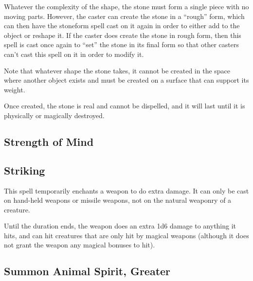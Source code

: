 \begin{multicols*}{2}
Whatever the complexity of the shape, the stone must form a single piece with no moving parts. However, the caster can create the stone in a “rough” form, which can then have the stoneform spell cast on it again in order to either add to the object or reshape it. If the caster does create the stone in rough form, then this spell is cast once again to “set” the stone in its final form so that other casters can’t cast this spell on it in order to modify it.

Note that whatever shape the stone takes, it cannot be created in the space where another object exists and must be created on a surface that can support its weight.

Once created, the stone is real and cannot be dispelled, and it will last until it is physically or magically destroyed.

\subsection{Strength of Mind}\label{spell:Strength of Mind}



\subsection{Striking}\label{spell:Striking}

This spell temporarily enchants a weapon to do extra damage. It can only be cast on hand-held weapons or missile weapons, not on the natural weaponry of a creature.

Until the duration ends, the weapon does an extra 1d6 damage to anything it hits, and can hit creatures that are only hit by magical weapons (although it does not grant the weapon any magical bonuses to hit).

\subsection{Summon Animal Spirit, Greater}\label{spell:Summon Animal Spirit, Greater}
\end{multicols*}
